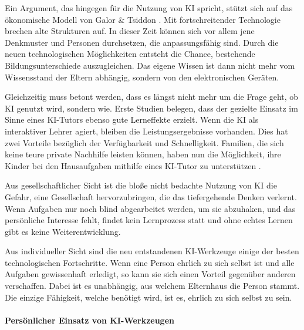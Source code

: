 \documentclass[11pt]{article}
\begin{document}
Ein Argument, das hingegen für die Nutzung von KI spricht, stützt sich auf das ökonomische Modell von Galor \& Tsiddon \cite{Mobility}. Mit fortschreitender Technologie brechen alte Strukturen auf. In dieser Zeit können sich vor allem jene Denkmuster und Personen durchsetzen, die anpassungsfähig sind. Durch die neuen technologischen Möglichkeiten entsteht die Chance, bestehende Bildungsunterschiede auszugleichen. Das eigene Wissen ist dann nicht mehr vom Wissensstand der Eltern abhängig, sondern von den elektronischen Geräten.

Gleichzeitig muss betont werden, dass es längst nicht mehr um die Frage geht, ob KI genutzt wird, sondern wie. Erste Studien belegen, dass der gezielte Einsatz im Sinne eines KI-Tutors ebenso gute Lerneffekte erzielt. Wenn die KI als interaktiver Lehrer agiert, bleiben die Leistungsergebnisse vorhanden. Dies hat zwei Vorteile bezüglich der Verfügbarkeit und Schnelligkeit. Familien, die sich keine teure private Nachhilfe leisten können, haben nun die Möglichkeit, ihre Kinder bei den Hausaufgaben mithilfe eines KI-Tutor zu unterstützen \cite{WozuLernenNochGutIst}.

Aus gesellschaftlicher Sicht ist die bloße nicht bedachte Nutzung von KI die Gefahr, eine Gesellschaft hervorzubringen, die das tiefergehende Denken verlernt. Wenn Aufgaben nur noch blind abgearbeitet werden, um sie abzuhaken, und das persönliche Interesse fehlt, findet kein Lernprozess statt und ohne echtes Lernen gibt es keine Weiterentwicklung.

Aus individueller Sicht sind die neu entstandenen KI-Werkzeuge einige der besten technologischen Fortschritte. Wenn eine Person ehrlich zu sich selbst ist und alle Aufgaben gewissenhaft erledigt, so kann sie sich einen Vorteil gegenüber anderen verschaffen. Dabei ist es unabhängig, aus welchem Elternhaus die Person stammt. Die einzige Fähigkeit, welche benötigt wird, ist es, ehrlich zu sich selbst zu sein.

\paragraph{Persönlicher Einsatz von KI-Werkzeugen}
\end{document}
